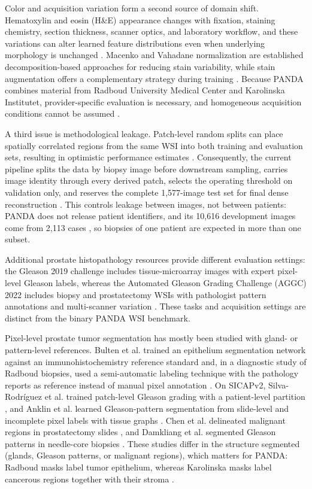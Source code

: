 \documentclass[10pt,letterpaper]{article}
\begin{document}
Color and acquisition variation form a second source of domain shift. Hematoxylin and eosin (H\&E) appearance changes with fixation, staining chemistry, section thickness, scanner optics, and laboratory workflow, and these variations can alter learned feature distributions even when underlying morphology is unchanged \cite{bib19,bib20,bib21}. Macenko and Vahadane normalization are established decomposition-based approaches for reducing stain variability, while stain augmentation offers a complementary strategy during training \cite{bib22,bib23,bib24}. Because PANDA combines material from Radboud University Medical Center and Karolinska Institutet, provider-specific evaluation is necessary, and homogeneous acquisition conditions cannot be assumed \cite{bib11}.

A third issue is methodological leakage. Patch-level random splits can place spatially correlated regions from the same WSI into both training and evaluation sets, resulting in optimistic performance estimates \cite{bib25,bib26,bib63}. Consequently, the current pipeline splits the data by biopsy image before downstream sampling, carries image identity through every derived patch, selects the operating threshold on validation only, and reserves the complete 1,577-image test set for final dense reconstruction \cite{bib25,bib27,bib28}. This controls leakage between images, not between patients: PANDA does not release patient identifiers, and its 10,616 development images come from 2,113 cases \cite{bib11}, so biopsies of one patient are expected in more than one subset.

Additional prostate histopathology resources provide different evaluation settings: the Gleason 2019 challenge includes tissue-microarray images with expert pixel-level Gleason labels, whereas the Automated Gleason Grading Challenge (AGGC) 2022 includes biopsy and prostatectomy WSIs with pathologist pattern annotations and multi-scanner variation \cite{bib64,bib65}. These tasks and acquisition settings are distinct from the binary PANDA WSI benchmark.

Pixel-level prostate tumor segmentation has mostly been studied with gland- or pattern-level references. Bulten et al. trained an epithelium segmentation network against an immunohistochemistry reference standard \cite{bibBulten2019} and, in a diagnostic study of Radboud biopsies, used a semi-automatic labeling technique with the pathology reports as reference instead of manual pixel annotation \cite{bib10}. On SICAPv2, Silva-Rodr\'iguez et al. trained patch-level Gleason grading with a patient-level partition \cite{bib45}, and Anklin et al. learned Gleason-pattern segmentation from slide-level and incomplete pixel labels with tissue graphs \cite{bibAnklin}. Chen et al. delineated malignant regions in prostatectomy slides \cite{bib59}, and Damkliang et al. segmented Gleason patterns in needle-core biopsies \cite{bib62}. These studies differ in the structure segmented (glands, Gleason patterns, or malignant regions), which matters for PANDA: Radboud masks label tumor epithelium, whereas Karolinska masks label cancerous regions together with their stroma \cite{bib11}.
\end{document}
